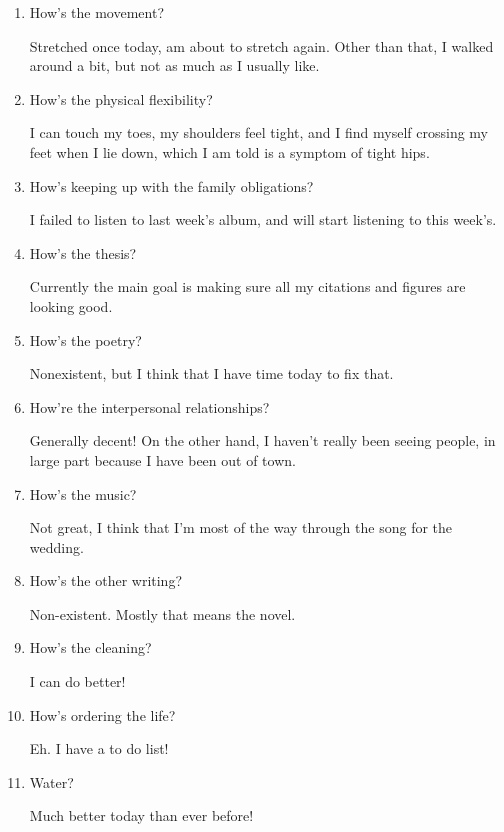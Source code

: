 \documentclass[12pt]{article}
\renewcommand{\,}{\textsuperscript{,}}
\begin{document}
\begin{enumerate}
\item How's the movement?

Stretched once today, am about to stretch again. Other than that, I walked around a bit, but not as much as I usually like.

\item How's the physical flexibility?

I can touch my toes, my shoulders feel tight, and I find myself crossing my feet when I lie down, which I am told is a symptom of tight hips.

\item How's keeping up with the family obligations?

I failed to listen to last week's album, and will start listening to this week's.

\item How's the thesis?

Currently the main goal is making sure all my citations and figures are looking good.

\item How's the poetry?

Nonexistent, but I think that I have time today to fix that.

\item How're the interpersonal relationships?

Generally decent! On the other hand, I haven't really been seeing people, in large part because I have been out of town.

\item How's the music?

Not great, I think that I'm most of the way through the song for the wedding.

\item How's the other writing?

Non-existent. Mostly that means the novel.

\item How's the cleaning?

I can do better!

\item How's ordering the life?

Eh. I have a to do list!

\item Water?

Much better today than ever before!

\end{enumerate}
\end{document}
